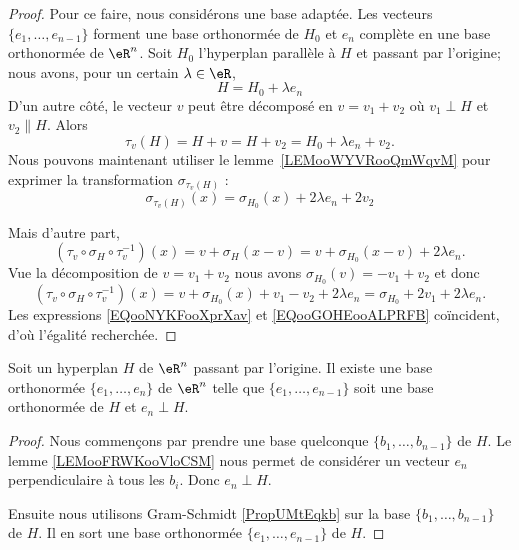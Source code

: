 \begin{proof}
	Pour ce faire, nous considérons une base adaptée. Les vecteurs \( \{ e_1,\ldots, e_{n-1} \}\) forment une base orthonormée de \( H_0\) et \( e_n\) complète en une base orthonormée de \( \eR^n\). Soit \( H_0\) l'hyperplan parallèle à \( H\) et passant par l'origine; nous avons, pour un certain \( \lambda\in \eR\),
	\begin{equation}
		H=H_0+\lambda e_n
	\end{equation}
	D'un autre côté, le vecteur \( v\) peut être décomposé en \( v=v_1+v_2\) où \( v_1\perp H\) et \( v_2\parallel H\). Alors
	\begin{equation}
		\tau_v(H)=H+v=H+v_2=H_0+\lambda e_n+v_2.
	\end{equation}
	Nous pouvons maintenant utiliser le lemme~\ref{LEMooWYVRooQmWqvM} pour exprimer la transformation \( \sigma_{\tau_v(H)}\) :
	\begin{equation}        \label{EQooNYKFooXprXav}
		\sigma_{\tau_v(H)}(x)=\sigma_{H_0}(x)+ 2\lambda e_n+2v_2
	\end{equation}

	Mais d'autre part,
	\begin{equation}
		(\tau_v\circ \sigma_H\circ\tau_{v}^{-1})(x)=v+\sigma_H(x-v)=v+\sigma_{H_0}(x-v)+2\lambda e_n.
	\end{equation}
	Vue la décomposition de \( v=v_1+v_2\) nous avons \( \sigma_{H_0}(v)=-v_1+v_2\) et donc
	\begin{equation}        \label{EQooGOHEooALPRFB}
		(\tau_v\circ \sigma_H\circ\tau_{v}^{-1})(x)= v+  \sigma_{H_0}(x)+v_1-v_2+2\lambda e_n=\sigma_{H_0}+2v_1+2\lambda e_n.
	\end{equation}
	Les expressions \eqref{EQooNYKFooXprXav} et \eqref{EQooGOHEooALPRFB} coïncident, d'où l'égalité recherchée.
\end{proof}

\begin{proposition}     \label{PROPooLYCUooRQgGtF}
	Soit un hyperplan \( H\) de \( \eR^n\) passant par l'origine. Il existe une base orthonormée \( \{ e_1,\ldots, e_n \}\) de \( \eR^n\) telle que \( \{ e_1,\ldots, e_{n-1} \}\) soit une base orthonormée de \( H\) et \( e_n\perp H\).
\end{proposition}

\begin{proof}
	Nous commençons par prendre une base quelconque \( \{ b_1,\ldots,b_{n-1} \}\) de \( H\). Le lemme \ref{LEMooFRWKooVloCSM} nous permet de considérer un vecteur \( e_n\) perpendiculaire à tous les \( b_i\). Donc \( e_n\perp H\).

	Ensuite nous utilisons Gram-Schmidt \ref{PropUMtEqkb} sur la base \( \{ b_1,\ldots,b_{n-1} \}\) de \( H\). Il en sort une base orthonormée \( \{ e_1,\ldots,e_{n-1} \}\) de \( H\).
\end{proof}


